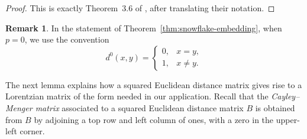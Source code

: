 \documentclass[12pt]{amsart}
\theoremstyle{definition}
\newtheorem{remark}[theorem]{Remark}
\newcommand{\1}{\mathbf{1}}
\begin{document}
\begin{proof}
This is exactly Theorem~3.6 of \cite{FaverEtAl}, after translating their notation.
\end{proof}

\begin{remark}
In the statement of Theorem~\ref{thm:snowflake-embedding}, when
$p=0$, we use the convention
\[
d^{0}(x,y)=
\begin{cases}
0, & x=y,\\
1, & x\ne y.
\end{cases}
\]
\end{remark}

The next lemma explains how a squared Euclidean distance matrix gives rise to a
Lorentzian matrix of the form needed in our application.  Recall that the
\emph{Cayley--Menger matrix} associated to a squared Euclidean distance matrix $B$ is
obtained from $B$ by adjoining a top row and left column of ones, with a zero in
the upper-left corner.
\end{document}
